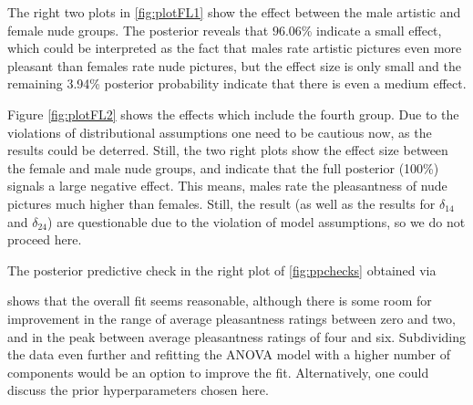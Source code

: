 The right two plots in  \ref{fig:plotFL1} show the effect between the male artistic and female nude groups. The posterior reveals that $96.06$\% indicate a small effect, which could be interpreted as the fact that males rate artistic pictures even more pleasant than females rate nude pictures, but the effect size is only small and the remaining 3.94\% posterior probability indicate that there is even a medium effect.

Figure \ref{fig:plotFL2} shows the effects which include the fourth group. Due to the violations of distributional assumptions one need to be cautious now, as the results could be deterred. Still, the two right plots show the effect size between the female and male nude groups, and indicate that the full posterior (100\%) signals a large negative effect. This means, males rate the pleasantness of nude pictures much higher than females. Still, the result (as well as the results for $\delta_{14}$ and $\delta_{24}$) are questionable due to the violation of model assumptions, so we do not proceed here.

The posterior predictive check in the right plot of  \ref{fig:ppchecks} obtained via
shows that the overall fit seems reasonable, although there is some room for improvement in the range of average pleasantness ratings between zero and two, and in the peak between average pleasantness ratings of four and six. Subdividing the data even further and refitting the ANOVA model with a higher number of components would be an option to improve the fit. Alternatively, one could discuss the prior hyperparameters chosen here.

